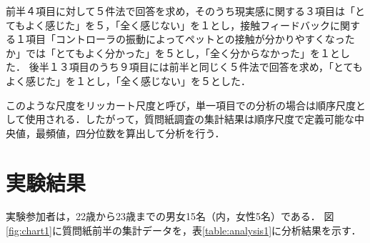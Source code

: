 \begin{table}[H]
\centering
\caption{質問紙の項目}
\label{table:petCondition}
\end{table}

前半４項目に対して５件法で回答を求め，そのうち現実感に関する３項目は「とてもよく感じた」を５，「全く感じない」を１とし，接触フィードバックに関する１項目「コントローラの振動によってペットとの接触が分かりやすくなったか」では「とてもよく分かった」を５とし，「全く分からなかった」を１とした．
後半１３項目のうち９項目には前半と同じく５件法で回答を求め，「とてもよく感じた」を１とし，「全く感じない」を５とした．

このような尺度をリッカート尺度と呼び，単一項目での分析の場合は順序尺度として使用される．したがって，質問紙調査の集計結果は順序尺度で定義可能な中央値，最頻値，四分位数を算出して分析を行う．

\section{実験結果}
実験参加者は，22歳から23歳までの男女15名（内，女性5名）である．
図\ref{fig:chart1}に質問紙前半の集計データを，表\ref{table:analysis1}に分析結果を示す．

